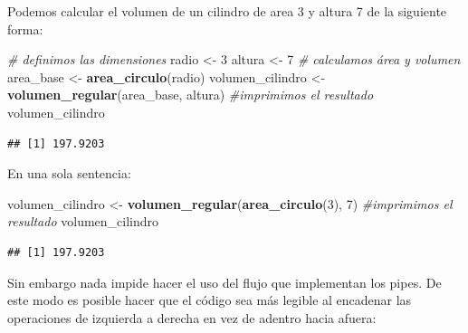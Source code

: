 \documentclass[]{book}
\newenvironment{Shaded}{\begin{snugshade}}{\end{snugshade}}
\newcommand{\KeywordTok}[1]{\textcolor[rgb]{0.13,0.29,0.53}{\textbf{#1}}}
\newcommand{\DecValTok}[1]{\textcolor[rgb]{0.00,0.00,0.81}{#1}}
\newcommand{\StringTok}[1]{\textcolor[rgb]{0.31,0.60,0.02}{#1}}
\newcommand{\CommentTok}[1]{\textcolor[rgb]{0.56,0.35,0.01}{\textit{#1}}}
\newcommand{\OperatorTok}[1]{\textcolor[rgb]{0.81,0.36,0.00}{\textbf{#1}}}
\newcommand{\NormalTok}[1]{#1}
\theoremstyle{definition}
\theoremstyle{definition}
\theoremstyle{definition}
\theoremstyle{remark}
\begin{document}
Podemos calcular el volumen de un cilindro de area 3 y altura 7 de la
siguiente forma:

\begin{Shaded}
\begin{Highlighting}[]
\CommentTok{# definimos las dimensiones}
\NormalTok{radio <-}\StringTok{ }\DecValTok{3}
\NormalTok{altura <-}\StringTok{ }\DecValTok{7}
\CommentTok{# calculamos área y volumen }
\NormalTok{area_base <-}\StringTok{ }\KeywordTok{area_circulo}\NormalTok{(radio)}
\NormalTok{volumen_cilindro <-}\StringTok{ }\KeywordTok{volumen_regular}\NormalTok{(area_base, altura)}
\CommentTok{#imprimimos el resultado}
\NormalTok{volumen_cilindro}
\end{Highlighting}
\end{Shaded}

\begin{verbatim}
## [1] 197.9203
\end{verbatim}

En una sola sentencia:

\begin{Shaded}
\begin{Highlighting}[]
\NormalTok{volumen_cilindro <-}\StringTok{ }\KeywordTok{volumen_regular}\NormalTok{(}\KeywordTok{area_circulo}\NormalTok{(}\DecValTok{3}\NormalTok{), }\DecValTok{7}\NormalTok{)}
\CommentTok{#imprimimos el resultado}
\NormalTok{volumen_cilindro}
\end{Highlighting}
\end{Shaded}

\begin{verbatim}
## [1] 197.9203
\end{verbatim}

Sin embargo nada impide hacer el uso del flujo que implementan los
pipes. De este modo es posible hacer que el código sea más legible al
encadenar las operaciones de izquierda a derecha en vez de adentro hacia
afuera:

\begin{Shaded}
\end{Shaded}
\end{document}
